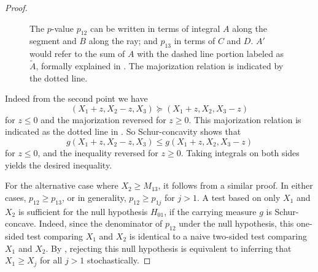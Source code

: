 \documentclass[11pt]{article}
\begin{document}
\begin{proof}
\begin{figure}[htbp]
\begin{center}
\end{center}
\caption{The $p$-value $p_{12}$ can be written in terms of integral $A$ along the segment and $B$ along the ray; and $p_{13}$ in terms of $C$ and $D$. $A'$ would refer to the sum of $A$ with the dashed line portion labeled as $\tilde{A}$, formally explained in . The majorization relation is indicated by the dotted line.}
\label{fig:compare_rays}
\end{figure}

Indeed from the second point  we have
$$\left(X_1 + z, X_2 - z, X_3\right) \succeq \left(X_1 + z, X_2, X_3 - z\right)$$
for $z \le 0$ and the majorization reversed for $z \ge 0$. This majorization relation is indicated as the dotted line in . So Schur-concavity shows that
$$g\left(X_1 + z, X_2 - z, X_3\right) \le g\left(X_1 + z, X_2, X_3 - z\right)$$
for $z \le 0$, and the inequality reversed for $z \ge 0$. Taking integrals on both sides yields the desired inequality.

For the alternative case where $X_2 \ge M_{13}$, it follows from a similar proof. In either cases, $p_{12} \ge p_{13}$, or in generality, $p_{12} \ge p_{1j}$ for $j > 1$. A test based on only $X_1$ and $X_2$ is sufficient for the null hypothesis $H_{01}$, if the carrying measure $g$ is Schur-concave. Indeed, since the denominator of $p_{12}$ under the null hypothesis, this one-sided test comparing $X_1$ and $X_2$ is identical to a naive two-sided test comparing $X_1$ and $X_2$. By , rejecting this null hypothesis is equivalent to inferring that $X_1 \ge X_j$ for all $j>1$ stochastically.

\end{proof}
\end{document}
